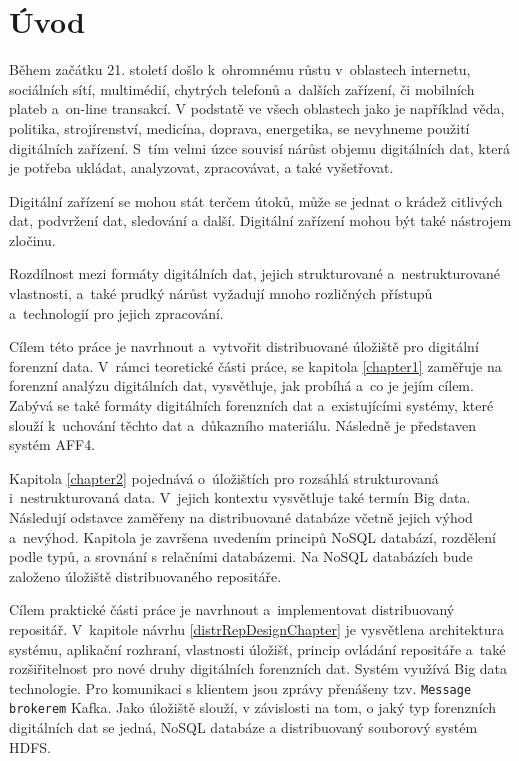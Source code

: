 

\chapter{Úvod}
Během začátku 21. století došlo k~ohromnému růstu v~oblastech internetu, sociálních sítí, multimédií, chytrých telefonů a~dalších zařízení, či mobilních plateb a~on-line transakcí. V podstatě ve všech oblastech jako je například věda, politika, strojírenství, medicína, doprava, energetika, se nevyhneme použití digitálních zařízení. S~tím velmi úzce souvisí nárůst objemu digitálních dat, která je potřeba ukládat, analyzovat, zpracovávat, a také vyšetřovat.

Digitální zařízení se mohou stát terčem útoků, může se jednat o krádež citlivých dat, podvržení dat, sledování a další. Digitální zařízení mohou být také nástrojem zločinu.

Rozdílnost mezi formáty digitálních dat, jejich strukturované a~nestrukturované vlastnosti, a~také prudký nárůst vyžadují mnoho rozličných přístupů a~technologií pro jejich zpracování.

Cílem této práce je navrhnout a~vytvořit distribuované úložiště pro digitální forenzní data. V~rámci teoretické části práce, se kapitola \ref{chapter1} zaměřuje na forenzní analýzu digitálních dat, vysvětluje, jak probíhá a~co je jejím cílem. Zabývá se také formáty digitálních forenzních dat a~existujícími systémy, které slouží k~uchování těchto dat a~důkazního materiálu. Následně je představen systém AFF4.

Kapitola \ref{chapter2} pojednává o~úložištích pro rozsáhlá strukturovaná i~nestrukturovaná data. V~jejich kontextu vysvětluje také termín Big data. Následují odstavce zaměřeny na distribuované databáze včetně jejich výhod a~nevýhod. Kapitola je završena uvedením principů NoSQL databází, rozdělení podle typů, a srovnání s relačními databázemi. Na NoSQL databázích bude založeno úložiště distribuovaného repositáře.

Cílem praktické části práce je navrhnout a~implementovat distribuovaný repositář. V~kapitole návrhu \ref{distrRepDesignChapter} je vysvětlena architektura systému, aplikační rozhraní, vlastnosti úložišť, princip ovládání repositáře a~také rozšiřitelnost pro nové druhy digitálních forenzních dat. Systém využívá Big data technologie. Pro komunikaci s klientem jsou zprávy přenášeny tzv. \texttt{Message brokerem} Kafka. Jako úložiště slouží, v závislosti na tom, o jaký typ forenzních digitálních dat se jedná, NoSQL databáze a distribuovaný souborový systém HDFS.

